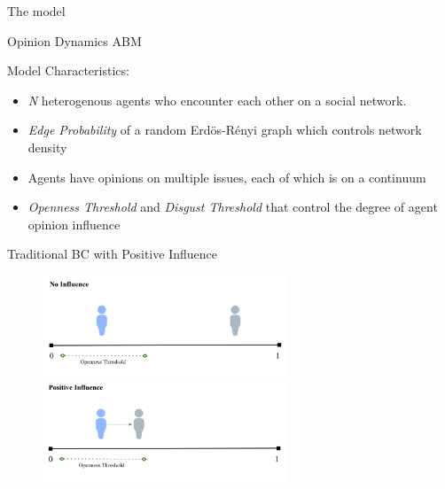 \documentclass[12pt]{beamer}
\begin{document}
\begin{frame}[c]{The model}  %




\large

\centering
Opinion Dynamics ABM

\vspace{.05in}
Model Characteristics:
\vspace{-.15in}

\small
\begin{itemize}
\itemsep.1em
\item \textit{N} heterogenous agents who encounter each other on a social network.
\item \textit{Edge Probability} of a random Erd\"{o}s-R\'{e}nyi graph which controls network density
\item Agents have opinions on multiple issues, each of which is on a continuum
\item \textit{Openness Threshold} and \textit{Disgust Threshold} that control the degree of agent opinion influence
\end{itemize}


\end{frame}


\begin{frame}[c]{Traditional BC with Positive Influence}  %


\begin{figure}
	\includegraphics[width=0.65\textwidth]{images/BCNoInfluence.png}
	\hfill
	\includegraphics[width=0.65\textwidth]{images/BCPositiveInfluence.png}
\end{figure}


\end{frame}
\end{document}
